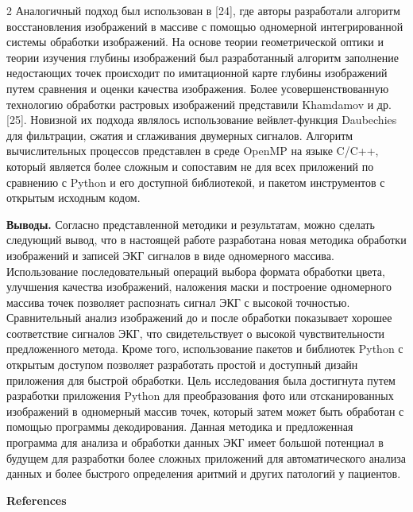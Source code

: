 \begin{multicols}{2}
Аналогичный подход был использован в {[}24{]}, где авторы разработали
алгоритм восстановления изображений в массиве с помощью одномерной
интегрированной системы обработки изображений. На основе теории
геометрической оптики и теории изучения глубины изображений был
разработанный алгоритм заполнение недостающих точек происходит по
имитационной карте глубины изображений путем сравнения и оценки качества
изображения. Более усовершенствованную технологию обработки растровых
изображений представили Khamdamov и др. {[}25{]}. Новизной их подхода
являлось использование вейвлет-функция Daubechies для фильтрации, сжатия
и сглаживания двумерных сигналов. Алгоритм вычислительных процессов
представлен в среде OpenMP на языке C/C++, который является более
сложным и сопоставим не для всех приложений по сравнению с Python и его
доступной библиотекой, и пакетом инструментов с открытым исходным кодом.

{\bfseries Выводы.} Согласно представленной методики и результатам, можно
сделать следующий вывод, что в настоящей работе разработана новая
методика обработки изображений и записей ЭКГ сигналов в виде одномерного
массива. Использование последовательный операций выбора формата
обработки цвета, улучшения качества изображений, наложения маски и
построение одномерного массива точек позволяет распознать сигнал ЭКГ с
высокой точностью. Сравнительный анализ изображений до и после обработки
показывает хорошее соответствие сигналов ЭКГ, что свидетельствует о
высокой чувствительности предложенного метода. Кроме того, использование
пакетов и библиотек Python с открытым доступом позволяет разработать
простой и доступный дизайн приложения для быстрой обработки. Цель
исследования была достигнута путем разработки приложения Python для
преобразования фото или отсканированных изображений в одномерный массив
точек, который затем может быть обработан с помощью программы
декодирования. Данная методика и предложенная программа для анализа и
обработки данных ЭКГ имеет большой потенциал в будущем для разработки
более сложных приложений для автоматического анализа данных и более
быстрого определения аритмий и других патологий у пациентов.
\end{multicols}

\begin{center}
{\bfseries References}
\end{center}

